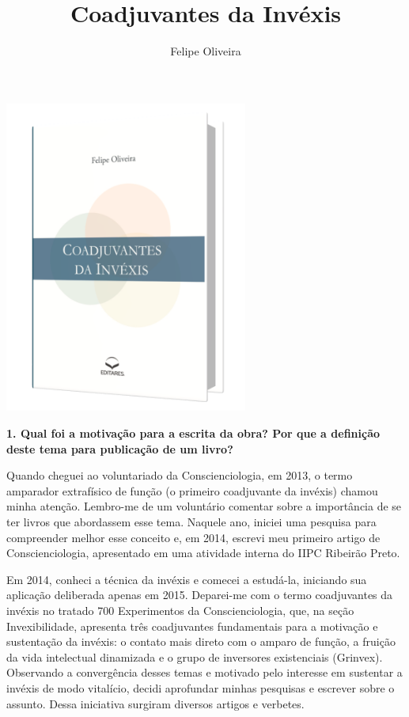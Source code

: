 \documentclass{gescons}
\author{Felipe Oliveira}
\title{Coadjuvantes da Invéxis}
\begin{document}
    \makeentrevistatitle

    \begin{multicols}{2}

\begin{center}
    \includegraphics[width=8cm]{articles/entrevista/mockups/Felipe_Oliveira.png}
\end{center}


\textbf{1. Qual foi a motivação para a escrita da obra? Por que a definição deste tema para publicação de um livro?}

Quando cheguei ao voluntariado da Conscienciologia, em 2013, o termo amparador extrafísico de função (o primeiro coadjuvante da invéxis) chamou minha atenção. Lembro-me de um voluntário comentar sobre a importância de se ter livros que abordassem esse tema. Naquele ano, iniciei uma pesquisa para compreender melhor esse conceito e, em 2014, escrevi meu primeiro artigo de Conscienciologia, apresentado em uma atividade interna do IIPC Ribeirão Preto.

Em 2014, conheci a técnica da invéxis e comecei a estudá-la, iniciando sua aplicação deliberada apenas em 2015. Deparei-me com o termo coadjuvantes da invéxis no tratado 700 Experimentos da Conscienciologia, que, na seção Invexibilidade, apresenta três coadjuvantes fundamentais para a motivação e sustentação da invéxis: o contato mais direto com o amparo de função, a fruição da vida intelectual dinamizada e o grupo de inversores existenciais (Grinvex). Observando a convergência desses temas e motivado pelo interesse em sustentar a invéxis de modo vitalício, decidi aprofundar minhas pesquisas e escrever sobre o assunto. Dessa iniciativa surgiram diversos artigos e verbetes.


\end{multicols}
\end{document}
